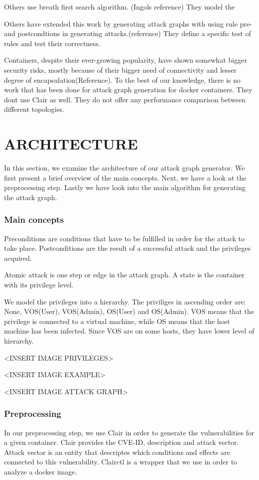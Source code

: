 \documentclass[letterpaper, 10 pt, conference]{ieeeconf}  %
\begin{document}
Others use breath first search algorithm. (Ingols reference)  They model the 

Others have extended this work by generating attack graphs with using rule pre- and postcondtions in generating attacks.(reference) They define a specific test of rules and test their correctness.

Containers, despite their ever-growing popularity, have shown somewhat bigger security risks, mostly because of their bigger need of connectivity and lesser degree of encapsulation(Reference). To the best of our knowledge, there is no work that has been done for attack graph generation for docker containers.
 They dont use Clair as well. They do not offer any performance comparison between different topologies. 

\section{ARCHITECTURE}

In this section, we examine the architecture of our attack graph generator. We first present a brief overview of the main concepts. Next, we have a look at the preprocessing step. Lastly we have look into the main algorithm for generating the attack graph.

\subsubsection{Main concepts}

Preconditions are conditions that have to be fulfilled in order for the attack to take place. Postconditions are the result of a successful attack and the privileges acquired.

Atomic attack is one step or edge in the attack graph. A state is the container with its privilege level.

We model the privileges into a hierarchy. The priviliges in ascending order are: None, VOS(User), VOS(Admin), OS(User) and OS(Admin). VOS means that the privilege is connected to a virtual machine, while OS means that the host machine has been infected. Since VOS are on some hosts, they have lower level of hierarchy.

<INSERT IMAGE PRIVILEGES>

<INSERT IMAGE EXAMPLE>

<INSERT IMAGE ATTACK GRAPH>


\subsubsection{Preprocessing}
In our preprocessing step, we use Clair in order to generate the vulnerabilities for a given container. Clair provides the CVE-ID, description and attack vector. Attack vector is an entity that descriptes which conditions and effects are connected to this vulnerability. Clairctl is a wrapper that we use in order to analyze a docker image. 
\end{document}
